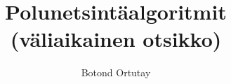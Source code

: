 \documentclass[language=finnish,version=final,mainfont=none,sharelatex=false]{utuftthesis}
\providecommand{\algorithmname}{Algoritmi}
\begin{document}
\title{Polunetsintäalgoritmit (väliaikainen otsikko)}
\author{Botond Ortutay}

\maketitle


\tableofcontents

\listoffigures


\listofacronyms

\renewcommand{\algorithmname}{\listingscaption}


\begin{comment}
To better organize things, create a new tex file for each chapter
and input it below.

Avoid using the å, ä, ö or <space> characters in referred names and
underscores \_ in file names (may break hyperref).

Good luck!
\end{comment}









\printbibliography

\begin{comment}
Important! Create the appendix chapters with command \textbackslash appchapter\{some
name\} instead of \textbackslash chapter\{some name\} for the automagic
page counting to work!
\end{comment}


\end{document}
